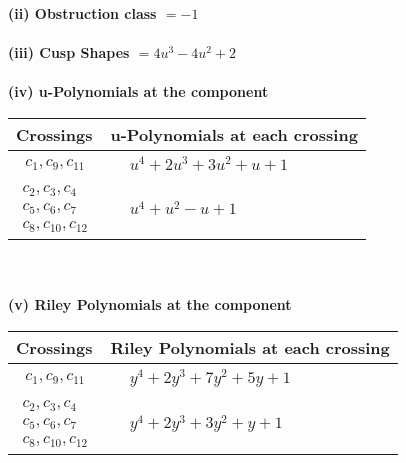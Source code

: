 \documentclass[1p]{elsarticle_modified}
\theoremstyle{definition}
\begin{document}
\flushleft \textbf{(ii) Obstruction class $= -1$}\\~\\
\flushleft \textbf{(iii) Cusp Shapes $= 4 u^3-4 u^2+2$}\\~\\
\newpage\renewcommand{\arraystretch}{1}
\flushleft \textbf{(iv) u-Polynomials at the component}\newline \\
\begin{tabular}{m{50pt}|m{274pt}}
Crossings & \hspace{64pt}u-Polynomials at each crossing \\
\hline $$\begin{aligned}c_{1},c_{9},c_{11}\end{aligned}$$&$\begin{aligned}
&u^4+2 u^3+3 u^2+u+1
\end{aligned}$\\
\hline $$\begin{aligned}c_{2},c_{3},c_{4}\\c_{5},c_{6},c_{7}\\c_{8},c_{10},c_{12}\end{aligned}$$&$\begin{aligned}
&u^4+u^2- u+1
\end{aligned}$\\
\hline
\end{tabular}\\~\\
\newpage\renewcommand{\arraystretch}{1}
\flushleft \textbf{(v) Riley Polynomials at the component}\newline \\
\begin{tabular}{m{50pt}|m{274pt}}
Crossings & \hspace{64pt}Riley Polynomials at each crossing \\
\hline $$\begin{aligned}c_{1},c_{9},c_{11}\end{aligned}$$&$\begin{aligned}
&y^4+2 y^3+7 y^2+5 y+1
\end{aligned}$\\
\hline $$\begin{aligned}c_{2},c_{3},c_{4}\\c_{5},c_{6},c_{7}\\c_{8},c_{10},c_{12}\end{aligned}$$&$\begin{aligned}
&y^4+2 y^3+3 y^2+y+1
\end{aligned}$\\
\hline
\end{tabular}\\~\\
\end{document}
